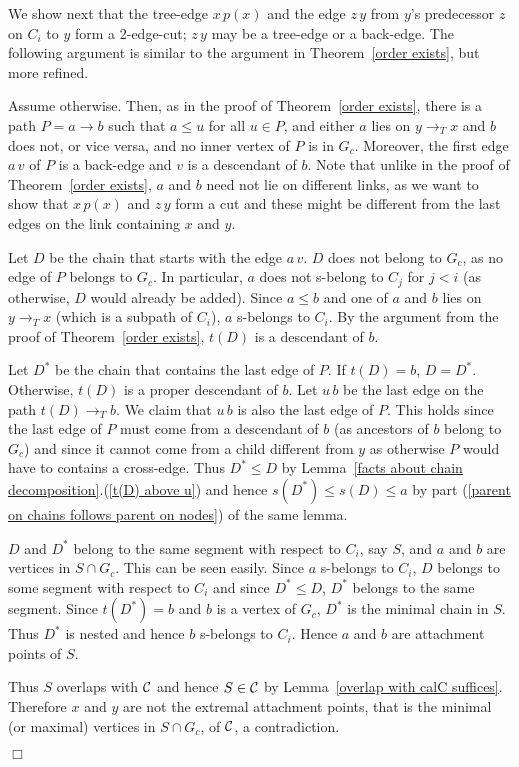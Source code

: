\documentclass[paper=a4]{scrartcl}
\newcommand{\qed}{}
\newcommand{\mqed}{\hfill$\Box$}
\newlength{\proofpostskipamount}\newlength{\proofpreskipamount}
\newenvironment{proof}{\par\vspace{\proofpreskipamount}\noindent{\textbf{Proof:}}\hspace{0.5em}}{\nopagebreak \strut\nopagebreak \hspace{\fill}\mqed\par\vspace{\proofpostskipamount}\noindent}
\newcommand{\edge}[2]{\ensuremath{#1\,#2}}
\begin{document}
\begin{proof}
We show next that the tree-edge $\edge{x}{p(x)}$ and the edge $\edge{z}{y}$ from $y$'s predecessor $z$ on $C_i$ to $y$ form a 2-edge-cut; $\edge{z}{y}$ may be a tree-edge or a back-edge. The following argument is similar to the argument in Theorem~\ref{order exists}, but more refined.

Assume otherwise. Then, as in the proof of Theorem~\ref{order exists}, there is a path $P=a\rightarrow b$ such that $a\le u$ for all $u\in P$, and either $a$ lies on $y\rightarrow_T x$ and $b$ does not, or vice versa, and no inner vertex of $P$ is in $G_c$. Moreover, the first edge $\edge av$ of $P$ is a back-edge and $v$ is a descendant of $b$. Note that unlike in the proof of  Theorem~\ref{order exists}, $a$ and $b$ need not lie on different links, as we want to show that $\edge{x}{p(x)}$ and $\edge{z}{y}$ form a cut and these might be different from the last edges on the link containing $x$ and $y$.

Let $D$ be the chain that starts with the edge $\edge{a}{v}$. $D$ does not belong to $G_c$, as no edge of $P$ belongs to $G_c$. In particular, $a$ does not s-belong to $C_j$ for $j < i$ (as otherwise, $D$ would already be added). Since $a \le b$ and one of $a$ and $b$ lies on $y \rightarrow_T x$ (which is a subpath of $C_i$), $a$ s-belongs to $C_i$. By the argument from the proof of Theorem~\ref{order exists}, $t(D)$ is a descendant of $b$.

Let $D^*$ be the chain that contains the last edge of $P$. If $t(D) = b$, $D = D^*$. Otherwise, $t(D)$ is a proper descendant of $b$. Let $\edge{u}{b}$ be the last edge on the path $t(D) \rightarrow_T b$.  We claim that $\edge{u}{b}$ is also the last edge of $P$. This holds since the last edge of $P$ must come from a descendant of $b$ (as ancestors of $b$ belong to $G_c$) and since it cannot come from a child different from $y$ as otherwise $P$ would have to contains a cross-edge. Thus $D^* \le D$ by Lemma~\ref{facts about chain decomposition}.(\ref{t(D) above u}) and hence $s(D^*) \le s(D) \le a$ by part (\ref{parent on chains follows parent on nodes}) of the same lemma.

$D$ and $D^*$ belong to the same segment with respect to $C_i$, say $S$, and $a$ and $b$ are vertices in $S \cap G_c$. This can be seen easily. Since $a$ s-belongs to $C_i$, $D$ belongs to some segment with respect to $C_i$ and since $D^* \le D$, $D^*$ belongs to the same segment. Since $t(D^*) = b$ and $b$ is a vertex of $G_c$, $D^*$ is the minimal chain in $S$. Thus $D^*$ is nested and hence $b$ s-belongs to $C_i$. Hence $a$ and $b$ are attachment points of $S$.

Thus $S$ overlaps with ${\mathcal{C}}$ and hence $S \in {\mathcal{C}}$ by Lemma~\ref{overlap with calC suffices}. Therefore $x$ and $y$ are not the extremal attachment points, that is the minimal (or maximal) vertices in $S\cap G_c$, of ${\mathcal{C}}$, a contradiction. \qed
\end{proof}
\end{document}
